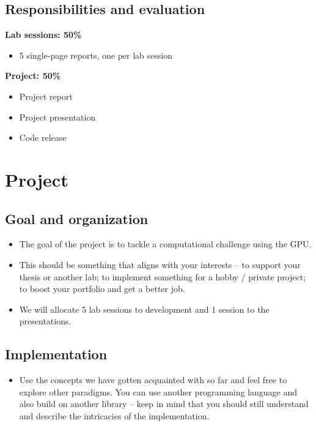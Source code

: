 \documentclass[11pt,a4paper]{article}
\begin{document}
\subsection{Responsibilities and evaluation}

\begin{minipage}[t]{0.48\linewidth}
\textbf{Lab sessions: 50\%}
\begin{itemize}[nosep]
  \item 5 single-page reports, one per lab session
\end{itemize}
\end{minipage}\hfill
\begin{minipage}[t]{0.48\linewidth}
\textbf{Project: 50\%}
\begin{itemize}[nosep]
  \item Project report
  \item Project presentation
  \item Code release
\end{itemize}
\end{minipage}

\section{Project}

\subsection{Goal and organization}
\begin{itemize}
  \item The goal of the project is to tackle a computational challenge using the GPU.
  \item This should be something that aligns with your interests -- to support your thesis or another lab; to implement something for a hobby / private project; to boost your portfolio and get a better job.
  \item We will allocate 5 lab sessions to development and 1 session to the presentations.
\end{itemize}

\subsection{Implementation}
\begin{itemize}
  \item Use the concepts we have gotten acquainted with so far and feel free to explore other paradigms. You can use another programming language and also build on another library -- keep in mind that you should still understand and describe the intricacies of the implementation.
\end{itemize}
\end{document}
